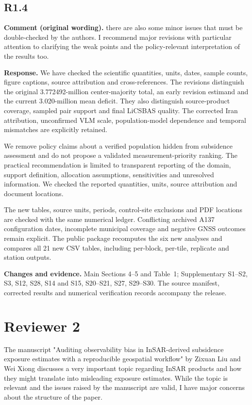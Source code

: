 \documentclass[11pt,a4paper]{article}
\begin{document}
\subsection*{R1.4}

\textbf{Comment (original wording).} there are also some minor issues that must be double-checked by the authors.
I recommend major revisions with particular attention to clarifying the weak points and the policy-relevant interpretation of the results too.

\textbf{Response.} We have checked the scientific quantities, units, dates, sample counts, figure captions, source attribution and cross-references. The revisions distinguish the original 3.772492-million center-majority total, an early revision estimand and the current 3.020-million mean deficit. They also distinguish source-product coverage, sampled pair support and final LiCSBAS quality. The corrected Iran attribution, unconfirmed VLM scale, population-model dependence and temporal mismatches are explicitly retained.

We remove policy claims about a verified population hidden from subsidence assessment and do not propose a validated measurement-priority ranking. The practical recommendation is limited to transparent reporting of the domain, support definition, allocation assumptions, sensitivities and unresolved information. We checked the reported quantities, units, source attribution and document locations.

The new tables, source units, periods, control-site exclusions and PDF locations are checked with the same numerical ledger. Conflicting archived A137 configuration dates, incomplete municipal coverage and negative GNSS outcomes remain explicit. The public package recomputes the six new analyses and compares all 21 new CSV tables, including per-block, per-tile, replicate and station outputs.

\textbf{Changes and evidence.} Main Sections 4--5 and Table~1; Supplementary S1--S2, S3, S12, S28, S14 and S15, S20--S21, S27, S29--S30. The source manifest, corrected results and numerical verification records accompany the release.

\section*{Reviewer 2}

The manuscript "Auditing observability bias in InSAR-derived subsidence exposure estimates with a reproducible geospatial workflow" by Zixuan Liu and Wei Xiong discusses a very important topic regarding InSAR products and how they might translate into misleading exposure estimates. While the topic is relevant and the issues raised by the manuscript are valid, I have major concerns about the structure of the paper.
\end{document}
